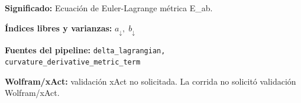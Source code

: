 \documentclass[11pt]{article}
\begin{document}
\begin{dmath*}[breakdepth={5}]
\end{dmath*}
\par\vspace{1.2\baselineskip}\noindent
\begin{minipage}{\linewidth}
\textbf{Significado:} Ecuación de Euler-Lagrange métrica E\_ab.\par
\textbf{Índices libres y varianzas:} $ a_{\downarrow},\;b_{\downarrow} $\par
\textbf{Fuentes del pipeline:} \texttt{delta\_lagrangian, curvature\_derivative\_metric\_term}\par
\textbf{Wolfram/xAct:} validación xAct no solicitada. La corrida no solicitó validación Wolfram/xAct.\par
\end{minipage}
\end{document}
